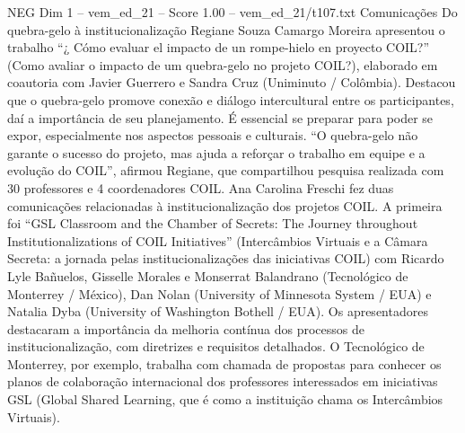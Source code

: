 \begin{textsample}{NEG Dim 1 – vem\_ed\_21 – Score 1.00 – vem\_ed\_21/t107.txt}  \label{ex:f1_neg_055}
Comunicações Do quebra-gelo à institucionalização Regiane Souza Camargo Moreira apresentou o trabalho “¿ Cómo evaluar el impacto de un rompe-hielo en proyecto COIL?” (Como avaliar o impacto de um quebra-gelo no projeto COIL?), elaborado em coautoria com Javier Guerrero e Sandra Cruz (Uniminuto / Colômbia).
Destacou que o quebra-gelo promove conexão e diálogo intercultural entre os participantes, daí a importância de seu planejamento.
É essencial se preparar para poder se expor, especialmente nos aspectos pessoais e culturais. “O quebra-gelo não garante o sucesso do projeto, mas ajuda a reforçar o trabalho em equipe e a evolução do COIL”, afirmou Regiane, que compartilhou pesquisa realizada com 30 professores e 4 coordenadores COIL.
Ana Carolina Freschi fez duas comunicações relacionadas à institucionalização dos projetos COIL.
A primeira foi “GSL Classroom and the Chamber of Secrets: The Journey throughout Institutionalizations of COIL Initiatives” (Intercâmbios Virtuais e a Câmara Secreta: a jornada pelas institucionalizações das iniciativas COIL) com Ricardo Lyle Bañuelos, Gisselle Morales e Monserrat Balandrano (Tecnológico de Monterrey / México), Dan Nolan (University of Minnesota System / EUA) e Natalia Dyba (University of Washington Bothell / EUA).
Os apresentadores destacaram a importância da melhoria contínua dos processos de institucionalização, com diretrizes e requisitos detalhados.
O Tecnológico de Monterrey, por exemplo, trabalha com chamada de propostas para conhecer os planos de colaboração internacional dos professores interessados em iniciativas GSL (Global Shared Learning, que é como a instituição chama os Intercâmbios Virtuais).

\end{textsample}
